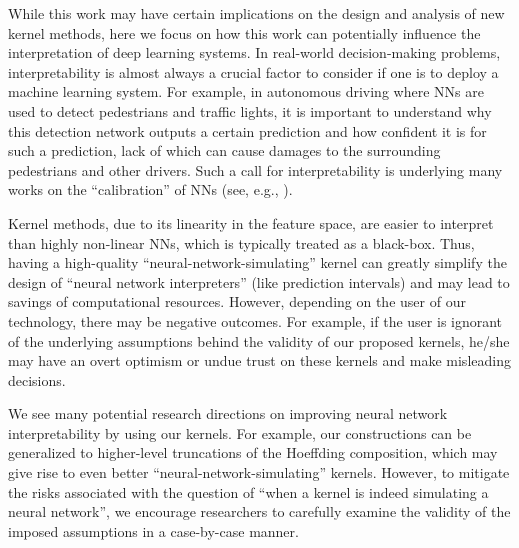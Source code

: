 While this work may have certain implications on the design and analysis of new kernel methods, here we focus on how this work can potentially influence the interpretation of deep learning systems. In real-world decision-making problems, interpretability is almost always a crucial factor to consider if one is to deploy a machine learning system. For example, in autonomous driving where NNs are used to detect pedestrians and traffic lights, it is important to understand why this detection network outputs a certain prediction and how confident it is for such a prediction, lack of which can cause damages to the surrounding pedestrians and other drivers. Such a call for interpretability is underlying many works on the ``calibration'' of NNs (see, e.g., \citealt{guo2017calibration}). 


Kernel methods, due to its linearity in the feature space, are easier to interpret than highly non-linear NNs, which is typically treated as a black-box. Thus, having a high-quality ``neural-network-simulating'' kernel can greatly simplify the design of ``neural network interpreters'' (like prediction intervals) and may lead to savings of computational resources. However, depending on the user of our technology, there may be negative outcomes. For example, if the user is ignorant of the underlying assumptions behind the validity of our proposed kernels, he/she may have an overt optimism or undue trust on these kernels and make misleading decisions.

We see many potential research directions on improving neural network interpretability by using our kernels. For example, our constructions can be generalized to higher-level truncations of the Hoeffding composition, which may give rise to even better ``neural-network-simulating'' kernels. %
However, to mitigate the risks associated with the question of ``when a kernel is indeed simulating a neural network'', we encourage researchers to carefully examine the validity of the imposed assumptions in a case-by-case manner.